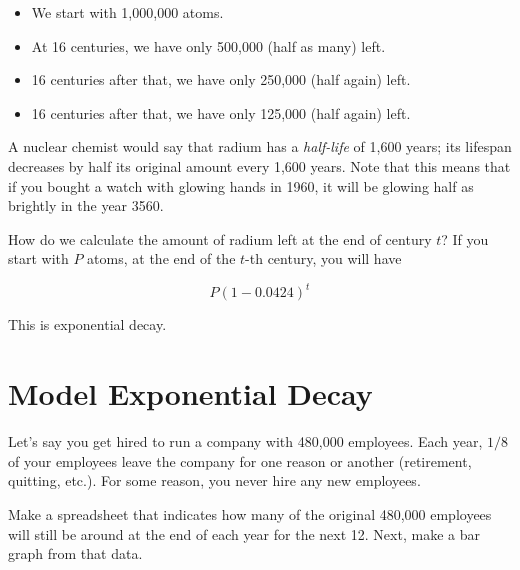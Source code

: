 \begin{itemize}
\item We start with 1,000,000 atoms.
\item At 16 centuries, we have only 500,000 (half as many) left.
\item 16 centuries after that, we have only 250,000 (half again) left.
\item 16 centuries after that, we have only 125,000 (half again) left.
\end{itemize}

A nuclear chemist would say that radium has a \textit{half-life} of
1,600 years; its lifespan decreases by half its original amount every 1,600 years. Note that this means that if you bought a watch with
glowing hands in 1960, it will be glowing half as brightly in the year
3560.

How do we calculate the amount of radium left at the end of century
$t$? If you start with $P$ atoms, at the end of the $t$-th century, you
will have

$$P\left(1 - 0.0424\right)^t$$

This is exponential decay.

\section{Model Exponential Decay}

Let's say you get hired to run a company with 480,000
employees. Each year, $1/8$ of your employees leave the company for
one reason or another (retirement, quitting, etc.). For some reason, you never
hire any new employees.

Make a spreadsheet that indicates how many of the original 480,000
employees will still be around at the end of each year for the next 12. Next, make a
bar graph from that data.

